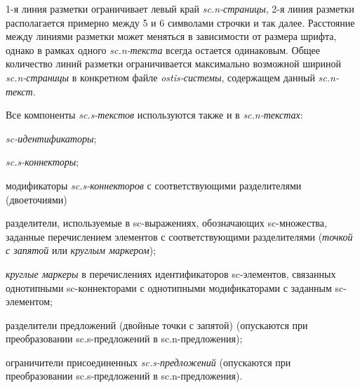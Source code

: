 \begin{SCn}
\end{SCn}

1-я линия разметки ограничивает левый край \textit{sc.n-страницы}, 2-я линия разметки располагается примерно между 5 и 6 символами строчки и так далее. Расстояние между линиями разметки может меняться в зависимости от размера шрифта, однако в рамках одного \textit{sc.n-текста} всегда остается одинаковым. Общее количество линий разметки ограничивается максимально возможной шириной \textit{sc.n-страницы} в конкретном файле \textit{ostis-системы}, содержащем данный \textit{sc.n-текст}.

\begin{SCn}
\begin{scnhaselementset}
\end{scnhaselementset}
\end{SCn}

Все компоненты \textit{sc.s-текстов} используются также и в \textit{sc.n-текстах}:
\begin{textitemize}
	\item \textit{sc-идентификаторы};
	\item \textit{sc.s-коннекторы};
	\item модификаторы \textit{sc.s-коннекторов} с соответствующими разделителями (двоеточиями)
	\item разделители, используемые в sc-выражениях, обозначающих sc-множества, заданные перечислением элементов с соответствующими разделителями (\textit{точкой с запятой} или \textit{круглым маркером});
	\item \textit{круглые маркеры} в перечислениях идентификаторов \mbox{sc-элементов}, связанных однотипными sc-коннекторами с однотипными модификаторами с заданным sc-элементом;
	\item разделители предложений (двойные точки с запятой) (опускаются при преобразовании \mbox{sc.s-предложений} в \mbox{sc.n-предложения});
	\item ограничители присоединенных \textit{sc.s-предложений} (опускаются при преобразовании sc.s-предложений в sc.n-предложения).
\end{textitemize}

